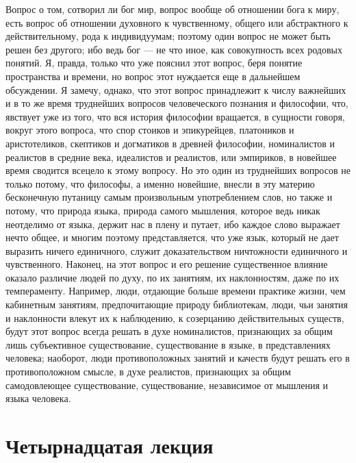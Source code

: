 \documentclass[12pt]{article}
\begin{document}
Вопрос о том, сотворил ли бог мир, вопрос вообще об отношении бога к миру, есть вопрос об отношении духовного к чувственному, общего или абстрактного к действительному, рода к индивидуумам; поэтому один вопрос не может быть решен без другого; ибо ведь бог --- не что иное, как совокупность всех родовых понятий. Я, правда, только что уже пояснил этот вопрос, беря понятие пространства и времени, но вопрос этот нуждается еще в дальнейшем обсуждении. Я замечу, однако, что этот вопрос принадлежит к числу важнейших и в то же время труднейших вопросов человеческого познания и философии, что, явствует уже из того, что вся история философии вращается, в сущности говоря, вокруг этого вопроса, что спор стоиков и эпикурейцев, платоников и аристотеликов, скептиков и догматиков в древней философии, номиналистов и реалистов в средние века, идеалистов и реалистов, или эмпириков, в новейшее время сводится всецело к этому вопросу. Но это один из труднейших вопросов не только потому, что философы, а именно новейшие, внесли в эту материю бесконечную путаницу самым произвольным употреблением слов, но также и потому, что природа языка, природа самого мышления, которое ведь никак неотделимо от языка, держит нас в плену и путает, ибо каждое слово выражает нечто общее, и многим поэтому представляется, что уже язык, который не дает выразить ничего единичного, служит доказательством ничтожности единичного и чувственного. Наконец, на этот вопрос и его решение существенное влияние оказало различие людей по духу, по их занятиям, их наклонностям, даже по их темпераменту. Например, люди, отдающие больше времени практике жизни, чем кабинетным занятиям, предпочитающие природу библиотекам, люди, чьи занятия и наклонности влекут их к наблюдению, к созерцанию действительных существ, будут этот вопрос всегда решать в духе номиналистов, признающих за общим лишь субъективное существование, существование в языке, в представлениях человека; наоборот, люди противоположных занятий и качеств будут решать его в противоположном смысле, в духе реалистов, признающих за общим самодовлеющее существование, существование, независимое от мышления и языка человека. 

{}
\section*{Четырнадцатая лекция}
\end{document}
